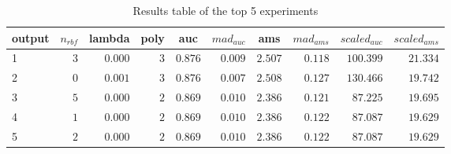 \begin{table}[!tbp]
\caption{Results table of the top 5 experiments\label{table:results}} 
\begin{center}
\begin{tabular}{lrrrrrrrrr}
\hline\hline
\multicolumn{1}{l}{output}&\multicolumn{1}{c}{$n_{rbf}$}&\multicolumn{1}{c}{lambda}&\multicolumn{1}{c}{poly}&\multicolumn{1}{c}{auc}&\multicolumn{1}{c}{$mad_{auc}$}&\multicolumn{1}{c}{ams}&\multicolumn{1}{c}{$mad_{ams}$}&\multicolumn{1}{c}{$scaled_{auc}$}&\multicolumn{1}{c}{$scaled_{ams}$}\tabularnewline
\hline
1&$3$&$0.000$&$3$&$0.876$&$0.009$&$2.507$&$0.118$&$100.399$&$21.334$\tabularnewline
2&$0$&$0.001$&$3$&$0.876$&$0.007$&$2.508$&$0.127$&$130.466$&$19.742$\tabularnewline
3&$5$&$0.000$&$2$&$0.869$&$0.010$&$2.386$&$0.121$&$ 87.225$&$19.695$\tabularnewline
4&$1$&$0.000$&$2$&$0.869$&$0.010$&$2.386$&$0.122$&$ 87.087$&$19.629$\tabularnewline
5&$2$&$0.000$&$2$&$0.869$&$0.010$&$2.386$&$0.122$&$ 87.087$&$19.629$\tabularnewline
\hline
\end{tabular}\end{center}
\end{table}
